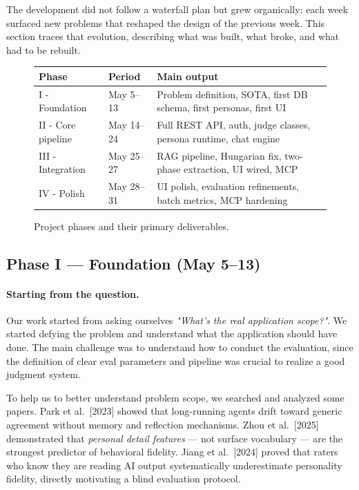 \documentclass[12pt,a4paper]{article}
\begin{document}
The development did not follow a waterfall plan but grew organically:
each week surfaced new problems that reshaped the design of the previous week. This section traces that evolution, describing what was built, what broke, and what had to be rebuilt.

\begin{figure}[ht]
\centering
\small
\begin{tabular}{@{}>{\raggedright\arraybackslash}p{2.8cm}>{\raggedright\arraybackslash}p{2.0cm}>{\raggedright\arraybackslash}p{9.6cm}@{}}
\toprule
\textbf{Phase} & \textbf{Period} & \textbf{Main output} \\
\midrule
I - Foundation   & May 5--13  & Problem definition, SOTA, first DB schema, first personas, first UI \\
II - Core pipeline & May 14--24 & Full REST API, auth, judge classes, persona runtime, chat engine \\
III - Integration  & May 25--27 & RAG pipeline, Hungarian fix, two-phase extraction, UI wired, MCP \\
IV - Polish        & May 28--31 & UI polish, evaluation refinements, batch metrics, MCP hardening \\
\bottomrule
\end{tabular}
\normalsize
\caption{Project phases and their primary deliverables.}
\end{figure}

\subsection{Phase I --- Foundation (May 5--13)}

\paragraph{Starting from the question.}
Our work started from asking ourselves  \textit{"What's the real application scope?"}. We started defying the problem and understand what the application should have done. The main challenge was to understand how to conduct the evaluation, since the definition of clear eval parameters and pipeline was crucial to realize a good judgment system.

To help us to better understand problem scope, we searched and analyzed some papers. Park et al.\ [2023] showed that long-running agents drift toward
generic agreement without memory and reflection mechanisms. Zhou et al.\ [2025] demonstrated that
\emph{personal detail features} --- not surface vocabulary --- are the strongest predictor of
behavioral fidelity. Jiang et al.\ [2024] proved that raters who know they are reading AI output
systematically underestimate personality fidelity, directly motivating a blind evaluation
protocol.
\end{document}
